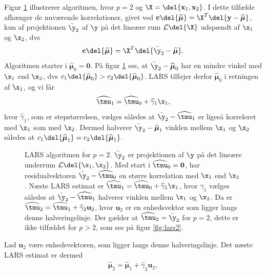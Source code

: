 Figur \ref{fig:lars} illustrerer algoritmen, hvor $p = 2$ og $\X = \del{\textbf{x}_1, \textbf{x}_2}$.
I dette tilfælde afhænger de nuværende korrelationer, givet ved \(\textbf{c}\del{\boldsymbol{\widehat{\mu}}} = \X^T\del{\textbf{y} - \widehat{\boldsymbol{\mu}}}\), kun af projektionen \(\bar{\y}_2\) af \(\y\) på det lineære rum $\mathcal{L} \del{\X}$ udspændt af \(\x_1\) og \(\x_2\), dvs 
\begin{align*}
\textbf{c}\del{\boldsymbol{\widehat{\mu}}} =  \X^T \del{ \bar{\y}_2 - \boldsymbol{\widehat{\mu}}}.
\end{align*}
Algoritmen starter i $\widehat{\boldsymbol{\mu}}_0 = \textbf{0}$.
På figur \ref{fig:lars} ses, at \(\bar{\y}_2 - \widehat{\boldsymbol{\mu}}_0\) har en mindre vinkel med \(\x_1\) end \(\x_2\), dvs \(c_1 \del{\widehat{\boldsymbol{\mu}}_0} > c_2 \del{\widehat{\boldsymbol{\mu}}_0}\).
LARS tilføjer derfor \(\widehat{\boldsymbol{\mu}}_0\) i retningen af \(\x_1\), og vi får
\begin{align*}
\widehat{\tmu}_1 = \widehat{\tmu}_0 + \widehat{\gamma}_1 \x_1,
\end{align*}
hvor \(\widehat{\gamma}_1\), som er stepstørrelsen, vælges således at  \(\bar{\y}_2 - \widehat{\tmu}_1\) er ligeså korreleret med \(\x_1\) som med \(\x_2\).
Dermed halverer \(\bar{\y}_2 - \widehat{\boldsymbol{\mu}}_1\) vinklen mellem \(\x_1\) og \(\x_2\) således at \(c_1 \del{\widehat{\boldsymbol{\mu}}_1} = c_2 \del{\widehat{\boldsymbol{\mu}}_1}\).
%
\begin{figure}[H]
\centering
\scalebox{0.8}{}
\caption{LARS algoritmen for \(p=2\). \(\bar{\y}_2\) er projektionen af \(\y\) på det lineære underrum \(\mathcal{L} \del{\x_1, \x_2}\).
Med start i \(\widehat{\tmu}_0=\mathbf{0}\), har residualvektoren \(\bar{\y}_2 - \widehat{\tmu}_0\) en større korrelation med \(\x_1\) end \(\x_2\). Næste LARS estimat er \(\widehat{\tmu}_1 = \widehat{\tmu}_0 + \widehat{\gamma}_1 \x_1\), hvor \(\widehat{\gamma}_1\) vælges således at \(\bar{\y}_2 - \widehat{\tmu}_1\) halverer vinklen mellem \(\x_1\) og \(\x_2\). Da er \(\widehat{\tmu}_2 = \widehat{\tmu}_1 + \widehat{\gamma}_2 \mathbf{u}_2\), hvor \(\mathbf{u}_2\) er en enhedsvektor som ligger langs denne halveringslinje.
Der gælder at \(\widehat{\tmu}_2 = \bar{\y}_2\) for \(p=2\), dette er ikke tilfældet for \(p>2\), som ses på figur \ref{fig:lars2}.
 }\label{fig:lars}
\end{figure}
%
Lad $\mathbf{u}_2$ være enhedsvektoren, som ligger langs denne halveringslinje.
Det næste LARS estimat er dermed
\begin{align*}
\widehat{\boldsymbol{\mu}}_2 = \widehat{\boldsymbol{\mu}}_1+ \widehat{\gamma}_2 \mathbf{u}_2,
\end{align*}
